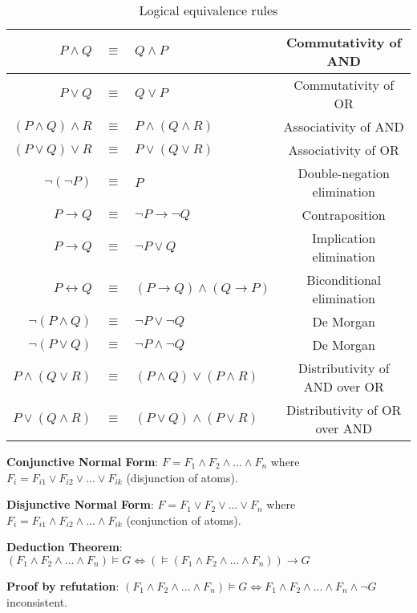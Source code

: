 \documentclass[]{article}
\begin{document}
\begin{table}[h]
	\centering
	\caption{Logical equivalence rules}
	\begin{tabular}{ | r  c  l  c | } 
		\hline
		$P \land Q$ & $\equiv$ & $Q \land P$ & Commutativity of AND\\
		\hline
		$P \lor Q$ & $\equiv$ & $Q \lor P$ & Commutativity of OR\\
		\hline
		$(P \land Q) \land R$ & $\equiv$ & $P \land (Q \land R)$ & Associativity of AND\\
		\hline
		$(P \lor Q) \lor R$ & $\equiv$ & $P \lor (Q \lor R)$ & Associativity of OR\\
		\hline
		$\neg(\neg P)$ & $\equiv$ & $P$ & Double-negation elimination\\
		\hline
		$P \rightarrow Q$ & $\equiv$ & $\neg P \rightarrow \neg Q$ & Contraposition\\
		\hline
		$P \rightarrow Q$ & $\equiv$ & $\neg P \lor Q$ & Implication elimination\\
		\hline
		$P \leftrightarrow Q$ & $\equiv$ & $(P \rightarrow Q) \land (Q \rightarrow P)$ & Biconditional elimination \\
		\hline
		$\neg(P \land Q)$ & $\equiv$ & $\neg P \lor \neg Q$ & De Morgan\\
		\hline
		$\neg(P \lor Q)$ & $\equiv$ & $\neg P \land \neg Q$ & De Morgan\\
		\hline
		$P \land (Q \lor R)$ & $\equiv$ & $(P \land Q) \lor (P \land R)$ & Distributivity of AND over OR\\
		\hline
		$P \lor (Q \land R)$ & $\equiv$ & $(P \lor Q) \land (P \lor R)$ & Distributivity of OR over AND\\
		\hline
	\end{tabular}
\end{table}

\noindent \textbf{Conjunctive Normal Form}: $F = F_1 \land F_2 \land ... \land F_n $ where $F_i = F_{i1} \lor F_{i2} \lor ... \lor F_{ik} $ (disjunction of atoms).

\noindent \textbf{Disjunctive Normal Form}: $F = F_1 \lor F_2 \lor ... \lor F_n $ where $F_i = F_{i1} \land F_{i2} \land ... \land F_{ik} $ (conjunction of atoms).

\noindent \textbf{Deduction Theorem}: $(F_1 \land F_2 \land ... \land F_n) \models G \iff (\models(F_1 \land F_2 \land ... \land F_n)) \rightarrow G$

\noindent \textbf{Proof by refutation}: $(F_1 \land F_2 \land ... \land F_n) \models G \iff F_1 \land F_2 \land ... \land F_n \land \neg G $ inconsistent.
\end{document}
